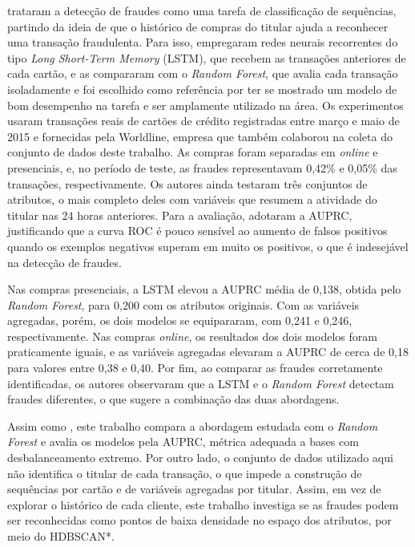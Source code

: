 \documentclass{uflamon}          %
\begin{document}
 trataram a detecção de fraudes como uma tarefa de classificação de sequências, partindo da ideia de que o histórico de compras do titular ajuda a reconhecer uma transação fraudulenta. Para isso, empregaram redes neurais recorrentes do tipo \textit{Long Short-Term Memory} (LSTM), que recebem as transações anteriores de cada cartão, e as compararam com o \textit{Random Forest}, que avalia cada transação isoladamente e foi escolhido como referência por ter se mostrado um modelo de bom desempenho na tarefa e ser amplamente utilizado na área. Os experimentos usaram transações reais de cartões de crédito registradas entre março e maio de 2015 e fornecidas pela Worldline, empresa que também colaborou na coleta do conjunto de dados deste trabalho. As compras foram separadas em \textit{online} e presenciais, e, no período de teste, as fraudes representavam 0,42\% e 0,05\% das transações, respectivamente. Os autores ainda testaram três conjuntos de atributos, o mais completo deles com variáveis que resumem a atividade do titular nas 24 horas anteriores. Para a avaliação, adotaram a AUPRC, justificando que a curva ROC é pouco sensível ao aumento de falsos positivos quando os exemplos negativos superam em muito os positivos, o que é indesejável na detecção de fraudes.

Nas compras presenciais, a LSTM elevou a AUPRC média de 0,138, obtida pelo \textit{Random Forest}, para 0,200 com os atributos originais. Com as variáveis agregadas, porém, os dois modelos se equipararam, com 0,241 e 0,246, respectivamente. Nas compras \textit{online}, os resultados dos dois modelos foram praticamente iguais, e as variáveis agregadas elevaram a AUPRC de cerca de 0,18 para valores entre 0,38 e 0,40. Por fim, ao comparar as fraudes corretamente identificadas, os autores observaram que a LSTM e o \textit{Random Forest} detectam fraudes diferentes, o que sugere a combinação das duas abordagens.

Assim como , este trabalho compara a abordagem estudada com o \textit{Random Forest} e avalia os modelos pela AUPRC, métrica adequada a bases com desbalanceamento extremo. Por outro lado, o conjunto de dados utilizado aqui não identifica o titular de cada transação, o que impede a construção de sequências por cartão e de variáveis agregadas por titular. Assim, em vez de explorar o histórico de cada cliente, este trabalho investiga se as fraudes podem ser reconhecidas como pontos de baixa densidade no espaço dos atributos, por meio do HDBSCAN*.
\end{document}
